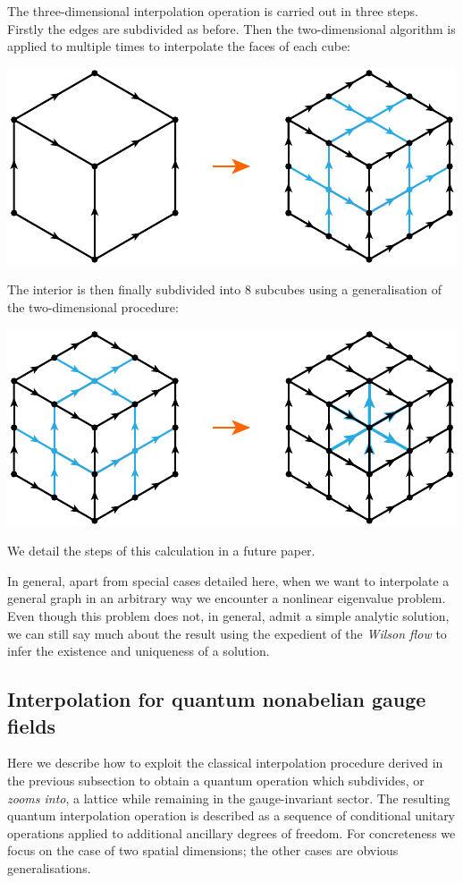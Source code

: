 \documentclass[twocolumn,lengthcheck,superscriptaddress]{revtex4-1}
\theoremstyle{definition}
\theoremstyle{remark}
\begin{document}
The three-dimensional interpolation operation is carried out in three steps. Firstly the edges are subdivided as before. Then the two-dimensional algorithm is applied to multiple times to interpolate the faces of each cube:
\begin{center}
	\includegraphics{cubeinterpf1.pdf}
\end{center}
The interior is then finally subdivided into 8 subcubes using a generalisation of the two-dimensional procedure:
\begin{center}
	\includegraphics{cubeinterpf2.pdf}
\end{center}
We detail the steps of this calculation in a future paper.

In general, apart from special cases detailed here, when we want to interpolate a general graph in an arbitrary way we encounter a nonlinear eigenvalue problem. Even though this problem does not, in general, admit a simple analytic solution, we can still say much about the result using the expedient of the \emph{Wilson flow} \cite{luscher:2010a,luscher:2010b} to infer the existence and uniqueness of a solution. 

\subsection{Interpolation for quantum nonabelian gauge fields}\label{sec:qinterp}
Here we describe how to exploit the classical interpolation procedure derived in the previous subsection to obtain a quantum operation which subdivides, or \emph{zooms into}, a lattice while remaining in the gauge-invariant sector. The resulting quantum interpolation operation is described as a sequence of conditional unitary operations applied to additional ancillary degrees of freedom. For concreteness we focus on the case of two spatial dimensions; the other cases are obvious generalisations. 
\end{document}
